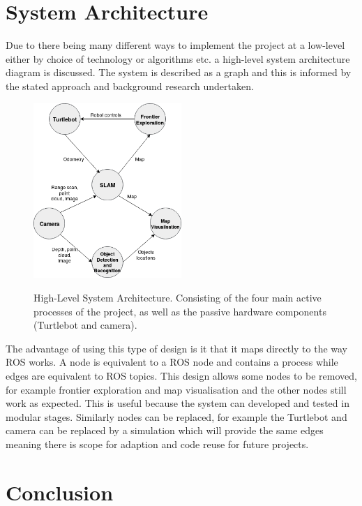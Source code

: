 \documentclass{mproj}
\begin{document}
\section{System Architecture}

Due to there being many different ways to implement the project at a low-level either by choice of technology or algorithms etc. a high-level system architecture diagram is discussed. The system is described as a graph and this is informed by the stated approach and background research undertaken.

\begin{figure}[h]
  \caption{High-Level System Architecture. Consisting of the four main active processes of the project, as well as the passive hardware components (Turtlebot and camera).}
  \centering
  \includegraphics[width=0.5\textwidth]{images/system-diagram.png}
  \label{fig:System Diagram}
\end{figure}

The advantage of using this type of design is it that it maps directly to the way ROS works. A node is equivalent to a ROS node and contains a process while edges are equivalent to ROS topics. This design allows some nodes to be removed, for example frontier exploration and map visualisation and the other nodes still work as expected. This is useful because the system can developed and tested in modular stages. Similarly nodes can be replaced, for example the Turtlebot and camera can be replaced by a simulation which will provide the same edges meaning there is scope for adaption and code reuse for future projects.

\section{Conclusion}
\end{document}
